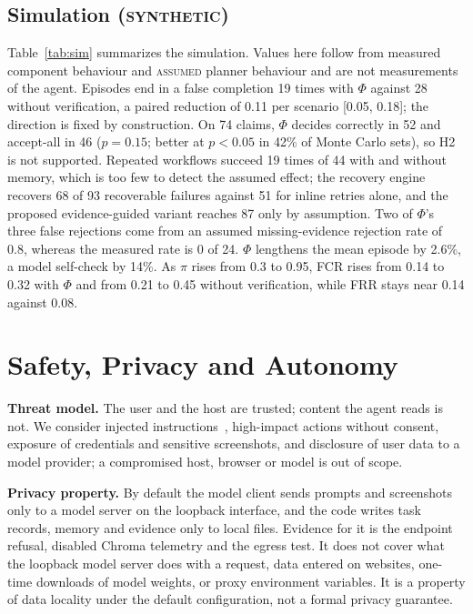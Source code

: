 \documentclass[conference]{IEEEtran}
\newcommand{\status}[1]{\textsc{#1}}
\begin{document}
\subsection{Simulation (\status{synthetic})}
Table~\ref{tab:sim} summarizes the simulation. Values here follow from measured component behaviour and \status{assumed} planner behaviour and are not measurements of the agent. Episodes end in a false completion 19 times with $\Phi$ against 28 without verification, a paired reduction of 0.11 per scenario [0.05, 0.18]; the direction is fixed by construction. On 74 claims, $\Phi$ decides correctly in 52 and accept-all in 46 ($p=0.15$; better at $p<0.05$ in 42\% of Monte Carlo sets), so H2 is not supported. Repeated workflows succeed 19 times of 44 with and without memory, which is too few to detect the assumed effect; the recovery engine recovers 68 of 93 recoverable failures against 51 for inline retries alone, and the proposed evidence-guided variant reaches 87 only by assumption. Two of $\Phi$'s three false rejections come from an assumed missing-evidence rejection rate of 0.8, whereas the measured rate is 0 of 24. $\Phi$ lengthens the mean episode by 2.6\%, a model self-check by 14\%. As $\pi$ rises from 0.3 to 0.95, FCR rises from 0.14 to 0.32 with $\Phi$ and from 0.21 to 0.45 without verification, while FRR stays near 0.14 against 0.08.

\section{Safety, Privacy and Autonomy}

\textbf{Threat model.} The user and the host are trusted; content the agent reads is not. We consider injected instructions~\cite{greshake2023indirect}, high-impact actions without consent, exposure of credentials and sensitive screenshots, and disclosure of user data to a model provider; a compromised host, browser or model is out of scope.

\textbf{Privacy property.} By default the model client sends prompts and screenshots only to a model server on the loopback interface, and the code writes task records, memory and evidence only to local files. Evidence for it is the endpoint refusal, disabled Chroma telemetry and the egress test. It does not cover what the loopback model server does with a request, data entered on websites, one-time downloads of model weights, or proxy environment variables. It is a property of data locality under the default configuration, not a formal privacy guarantee.
\end{document}
